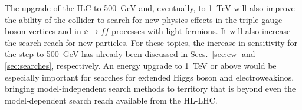 The upgrade of the ILC to 500~GeV and, eventually, to 1~TeV will also
improve the ability of the collider to search for new physics effects
in the triple gauge boson vertices and  in $\ee\to ff$ processes with
light fermions.  It will also increase the search reach for new
particles.  For these topics, the increase in sensitivity for the step
to 500~GeV has already been discussed in Secs.~\ref{sec:ew} and
\ref{sec:searches}, respectively.  An energy upgrade to
1~TeV or above would be especially important for searches for extended
Higgs boson and electroweakinos, bringing model-independent search
methods to territory that is beyond even the model-dependent search
reach available from the HL-LHC.













